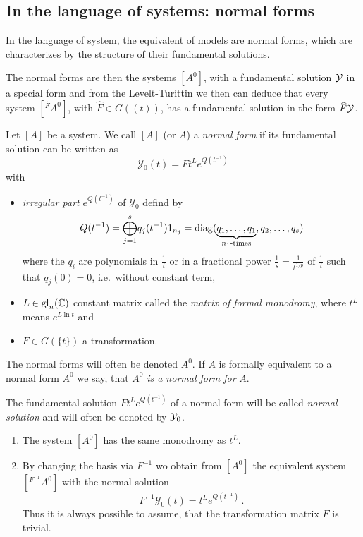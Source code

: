 \subsection{In the language of systems: normal forms}
In the language of system, the equivalent of models are normal forms, which are
characterizes by the structure of their fundamental solutions.

The normal forms are then the systems $[A^0]$, with a fundamental solution
$\mathcal{Y}$ in a special form and from the Levelt-Turittin we then can deduce that
every system $[{}^{\hat F}\!A^0]$, with $\hat F\in G(\!(t)\!)$, has a
fundamental solution in the form $\widehat F\mathcal{Y}$.
\begin{defn}\label{defn:normSol}
  Let $[A]$ be a system.
  We call $[A]$ (or $A$) a \emph{normal form} if its fundamental solution can
  be written as
  \[
    \mathcal{Y}_0(t)=F t^L e^{Q(t^{-1})}
  \]
  with
  \begin{itemize}
    \item \emph{irregular part} $e^{Q(t^{-1})}$ of $\mathcal{Y}_0$ defind by
      \[
        Q(t^{-1})=\underset{j=1}{\overset{s}{\bigoplus}}q_j(t^{-1})1_{n_j}
          =\diag(\underset{n_1\text{-times}}{\underbrace{%
          q_1,\dots,q_1}},q_2,\dots,q_s)
      \]
      where the $q_i$ are polynomials in $\frac{1}{t}$ or in a fractional power
      $\frac{1}{s}=\frac{1}{t^{1/p}}$ of $\frac{1}{t}$ such that $q_j(0)=0$,
      i.e.\ without constant term,
    \item $L\in\operatorname{gl}_n(\mathbb{C})$ constant matrix called the \emph{matrix of formal
      monodromy}, where $t^L$ means $e^{L\ln t}$ and
    \item $F\in G(\!\{t\}\!)$ a transformation.
  \end{itemize}
  The normal forms will often be denoted $A^0$.
  If $A$ is formally equivalent to a normal form $A^0$ we say, that $A^0$
  \emph{is a normal form for} $A$.

  The fundamental solution $F t^L e^{Q(t^{-1})}$ of a normal form will be
  called \emph{normal solution} and will often be denoted by $\mathcal{Y}_0$.
  \begin{s-rem}
    \begin{enumerate}
      \item The system $[A^0]$ has the same monodromy as $t^L$. 
      \item {}
        By changing the basis via $F^{-1}$ wo obtain from $[A^0]$ the
        equivalent system $[{}^{F^{-1}}\!A^0]$ with the normal solution
        \[
          F^{-1}\mathcal{Y}_0(t)=t^L e^{Q(t^{-1})} \,.
        \]
        Thus it is always possible to assume, that the transformation matrix
        $F$ is trivial.
    \end{enumerate}
  \end{s-rem}
\end{defn}
